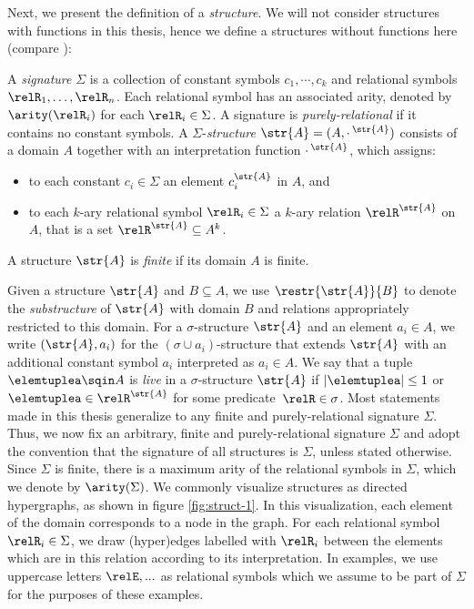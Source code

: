 Next, we present the definition of a \emph{structure}.
We will not consider structures with functions in this thesis, hence we define a structures without functions here (compare \cite[Definition 2.1]{Libkin04}):
\begin{definition}[Structures]
  A \emph{signature} $\Sigma$ is a collection of constant symbols $c_{1}, \cdots, c_{k}$ and relational symbols $\relR_{1}, \ldots, \relR_{n}$.
  Each relational symbol has an associated arity, denoted by $\arity(\relR_{i})$ for each $\relR_{i} \in \Sigma$.
  A signature is \emph{purely-relational} if it contains no constant symbols.
  A $\Sigma$-\emph{structure} $\str{A} = (A, {\cdot\,}^{\str{A}})$ consists of a domain $A$ together with an interpretation function ${\cdot\,}^{\str{A}}$, which assigns:
  \begin{itemize}
    \item to each constant $c_{i} \in \Sigma$ an element $c_{i}^{\str{A}}$ in $A$, and
    \item to each $k$-ary relational symbol $\relR_{i} \in \Sigma$ a $k$-ary relation $\relR^{\str{A}}$ on $A$, that is a set $\relR^{\str{A}} \subseteq A^{k}$.
  \end{itemize}
  A structure $\str{A}$ is \emph{finite} if its domain $A$ is finite.
\end{definition}
Given a structure $\str{A}$ and $B \subseteq A$, we use $\restr{\str{A}}{B}$ to denote the \emph{substructure} of $\str{A}$ with domain $B$ and relations appropriately restricted to this domain.
For a $\sigma$-structure $\str{A}$ and an element $a_{i} \in A$, we write $(\str{A}, a_{i})$ for the $(\sigma \cup {a_{i}})$-structure that extends $\str{A}$ with an additional constant symbol $a_{i}$ interpreted as $a_{i} \in A$.
We say that a tuple $\elemtuplea \sqin A$ is \emph{live} in a $\sigma$-structure $\str{A}$ if $|\elemtuplea| \leq 1$ or~$\elemtuplea \in \relR^{\str{A}}$ for some predicate~$\relR \in \sigma$.
Most statements made in this thesis generalize to any finite and purely-relational signature $\Sigma$.
Thus, we now fix an arbitrary, finite and purely-relational signature $\Sigma$ and adopt the convention that the signature of all structures is $\Sigma$, unless stated otherwise.
Since $\Sigma$ is finite, there is a maximum arity of the relational symbols in $\Sigma$, which we denote by $\arity(\Sigma)$.
We commonly visualize structures as directed hypergraphs, as shown in figure \cref{fig:struct-1}.
In this visualization, each element of the domain corresponds to a node in the graph.
For each relational symbol $\relR_{i} \in \Sigma$, we draw (hyper)edges labelled with $\relR_{i}$ between the elements which are in this relation according to its interpretation.
In examples, we use uppercase letters $\relE, ...$ as relational symbols which we assume to be part of $\Sigma$ for the purposes of these examples.


